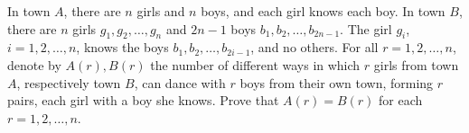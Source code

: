 In town $A$, there are $n$ girls and $n$ boys, and each girl knows each boy. In town $B$, there are $n$ girls $g_1, g_2, \ldots, g_n$ and $2n-1$ boys $b_1, b_2, \ldots, b_{2n-1}$. The girl $g_i$, $i=1,2,\ldots,n$, knows the boys $b_1, b_2, \ldots, b_{2i-1}$, and no others. For all $r=1,2,\ldots,n$, denote by $A(r), B(r)$ the number of different ways in which $r$ girls from town $A$, respectively town $B$, can dance with $r$ boys from their own town, forming $r$ pairs, each girl with a boy she knows. Prove that $A(r) = B(r)$ for each $r=1,2,\ldots,n$.
